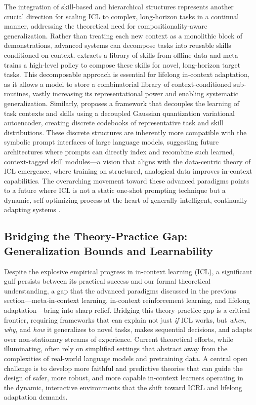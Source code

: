 \documentclass[11pt]{article}
\begin{document}
The integration of skill-based and hierarchical structures represents another crucial direction for scaling ICL to complex, long-horizon tasks in a continual manner, addressing the theoretical need for compositionality-aware generalization. Rather than treating each new context as a monolithic block of demonstrations, advanced systems can decompose tasks into reusable skills conditioned on context. \cite{ref602} extracts a library of skills from offline data and meta-trains a high-level policy to compose these skills for novel, long-horizon target tasks. This decomposable approach is essential for lifelong in-context adaptation, as it allows a model to store a combinatorial library of context-conditioned sub-routines, vastly increasing its representational power and enabling systematic generalization. Similarly, \cite{ref321} proposes a framework that decouples the learning of task contexts and skills using a decoupled Gaussian quantization variational autoencoder, creating discrete codebooks of representative task and skill distributions. These discrete structures are inherently more compatible with the symbolic prompt interfaces of large language models, suggesting future architectures where prompts can directly index and recombine such learned, context-tagged skill modules---a vision that aligns with the data-centric theory of ICL emergence, where training on structured, analogical data improves in-context capabilities. The overarching movement toward these advanced paradigms points to a future where ICL is not a static one-shot prompting technique but a dynamic, self-optimizing process at the heart of generally intelligent, continually adapting systems \cite{ref344}.

\subsection{Bridging the Theory-Practice Gap: Generalization Bounds and Learnability}

Despite the explosive empirical progress in in-context learning (ICL), a significant gulf persists between its practical success and our formal theoretical understanding, a gap that the advanced paradigms discussed in the previous section---meta-in-context learning, in-context reinforcement learning, and lifelong adaptation---bring into sharp relief. Bridging this theory-practice gap is a critical frontier, requiring frameworks that can explain not just \emph{if} ICL works, but \emph{when}, \emph{why}, and \emph{how} it generalizes to novel tasks, makes sequential decisions, and adapts over non-stationary streams of experience. Current theoretical efforts, while illuminating, often rely on simplified settings that abstract away from the complexities of real-world language models and pretraining data. A central open challenge is to develop more faithful and predictive theories that can guide the design of safer, more robust, and more capable in-context learners operating in the dynamic, interactive environments that the shift toward ICRL and lifelong adaptation demands.
\end{document}
